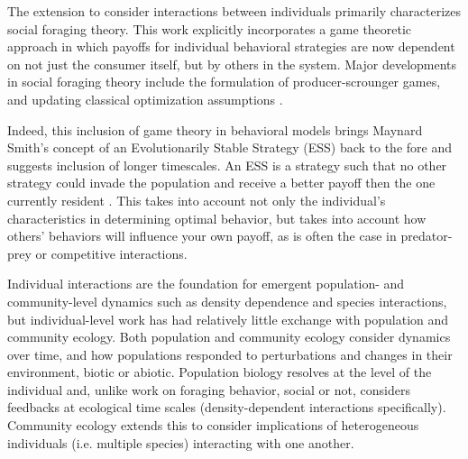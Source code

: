 \documentclass[12pt,a4paper]{report}
\begin{document}
The extension to consider interactions between individuals primarily characterizes social foraging theory. This work explicitly incorporates a game theoretic approach in which payoffs for individual behavioral strategies are now dependent on not just the consumer itself, but by others in the system. Major developments in social foraging theory include the formulation of producer-scrounger games, and updating classical optimization assumptions \citep{GiraldeauCaraco:2000}. 

Indeed, this inclusion of game theory in behavioral models brings Maynard Smith's concept of an Evolutionarily Stable Strategy (ESS) back to the fore and suggests inclusion of longer timescales. An ESS is a strategy such that no other strategy could invade the population and receive a better payoff then the one currently resident \citep{MaynardSmith:1974}. This takes into account not only the individual's characteristics in determining optimal behavior, but takes into account how others' behaviors will influence your own payoff, as is often the case in predator-prey or competitive interactions. 

Individual interactions are the foundation for emergent population- and community-level dynamics such as density dependence and species interactions, but individual-level work has had relatively little exchange with population and community ecology. Both population and community ecology consider dynamics over time, and how populations responded to perturbations and changes in their environment, biotic or abiotic. Population biology resolves at the level of the individual and, unlike work on foraging behavior, social or not, considers feedbacks at ecological time scales (density-dependent interactions specifically). Community ecology extends this to consider implications of heterogeneous individuals (i.e. multiple species) interacting with one another. 
\end{document}
